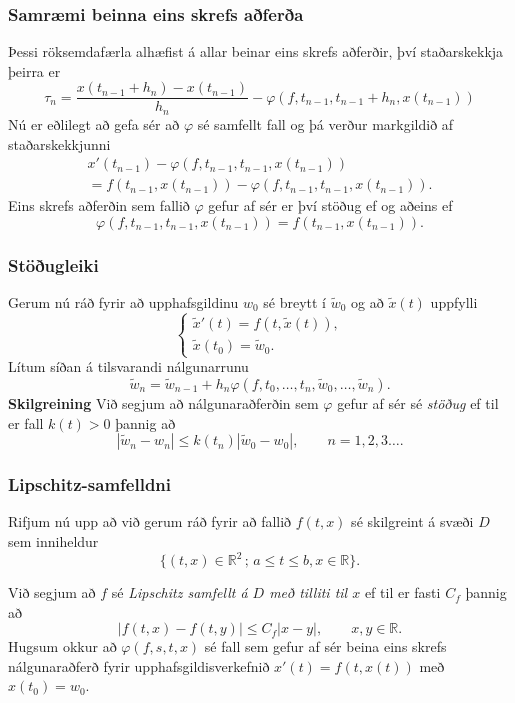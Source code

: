 \documentclass[icelandic,a4paper,12pt]{article}
\newcommand{\R}{{\mathbb  R}}
\begin{document}
\subsubsection{Samræmi beinna eins skrefs aðferða} 
Þessi röksemdafærla alhæfist á allar beinar eins skrefs aðferðir, því
staðarskekkja þeirra er 
$$
\tau_n=\dfrac{x(t_{n-1}+h_n)-x(t_{n-1})}{h_n}
-\varphi(f,t_{n-1},t_{n-1}+h_n,x(t_{n-1}))
$$
\pause
Nú er eðlilegt að gefa sér að $\varphi$ sé samfellt fall og
þá verður markgildið af staðarskekkjunni
\begin{multline*}
x'(t_{n-1})-\varphi(f,t_{n-1},t_{n-1},x(t_{n-1}))\\
=f(t_{n-1},x(t_{n-1}))-\varphi(f,t_{n-1},t_{n-1},x(t_{n-1})).
\end{multline*}
Eins skrefs aðferðin sem fallið $\varphi$ gefur af sér er því 
stöðug ef og aðeins ef 
$$
\varphi(f,t_{n-1},t_{n-1},x(t_{n-1}))
=f(t_{n-1},x(t_{n-1})).
$$



\subsubsection{Stöðugleiki} 
Gerum nú ráð fyrir að upphafsgildinu $w_0$ sé breytt í $\tilde w_0$ og
að $\tilde x(t)$ uppfylli
$$
\begin{cases}
  \tilde x'(t)=f(t,\tilde x(t)),\\
\tilde x(t_0)=\tilde w_0.
\end{cases}
$$
Lítum síðan á tilsvarandi nálgunarrunu
$$
\tilde w_n=\tilde w_{n-1}+h_n\varphi(f,t_0,\dots,t_n,\tilde
w_0,\dots,\tilde w_n).
$$
\pause
\textbf{Skilgreining}
Við segjum að nálgunaraðferðin sem $\varphi$ gefur af sér 
sé {\it stöðug} ef til er fall $k(t)>0$ þannig að
$$
|\tilde w_n-w_n|\leq k(t_n)|\tilde w_0-w_0|, \qquad n=1,2,3\dots.
$$




\subsubsection{Lipschitz-samfelldni} 
Rifjum nú upp að við gerum ráð fyrir að fallið $f(t,x)$ sé skilgreint
á svæði $D$ sem inniheldur 
$$
\{(t,x)\in \R^2 \, ;\, a\leq t\leq b, x\in \R\}.
$$

\pause
\smallskip
Við segjum að $f$ sé {\it Lipschitz samfellt á $D$ með tilliti til
  $x$} ef til er fasti $C_f$ þannig að 
$$
|f(t,x)-f(t,y)|\leq C_f|x-y|, \qquad x,y\in \R.
$$
Hugsum okkur að $\varphi(f,s,t,x)$ sé fall sem gefur af sér beina eins
skrefs nálgunaraðferð fyrir upphafsgildisverkefnið $x'(t)=f(t,x(t))$
með $x(t_0)=w_0$.  
\end{document}
